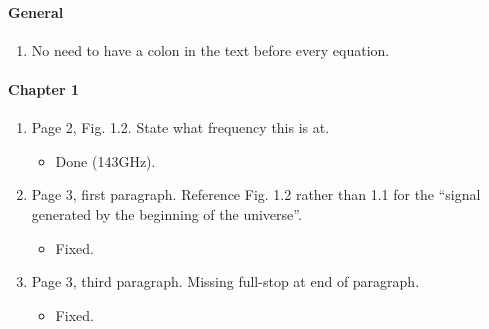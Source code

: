 \documentclass[11pt]{article}
\begin{document}

\paragraph{General}
\begin{enumerate}
\item No need to have a colon in the text before every equation.
\end{enumerate}

\paragraph{Chapter 1}
\begin{enumerate}
\item Page 2, Fig. 1.2. State what frequency this is at.
  \begin{itemize}
    \item Done (143GHz).
  \end{itemize}
\item Page 3, first paragraph. Reference Fig. 1.2 rather than 1.1 for
  the ``signal generated by the beginning of the universe''.
  \begin{itemize}
    \item Fixed.
  \end{itemize}
\item Page 3, third paragraph. Missing full-stop at end of paragraph.
  \begin{itemize}
    \item Fixed.
  \end{itemize}
\end{enumerate}
\end{document}
